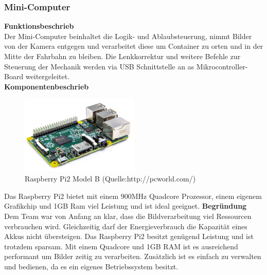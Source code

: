 \subsubsection{Mini-Computer}
\textbf{Funktionsbeschrieb}\\[0.2cm]
Der Mini-Computer beinhaltet die Logik- und Ablaubsteuerung, nimmt Bilder von der Kamera entgegen und verarbeitet diese um Container zu orten und in der Mitte der Fahrbahn zu bleiben. Die Lenkkorrektur und weitere Befehle zur Steuerung der Mechanik werden via USB Schnittstelle an as Mikrocontroller-Board weitergeleitet.\\[0.2cm]
\textbf{Komponentenbeschrieb}\\[0.2cm]
\begin{figure}[h]
	\centering
	\includegraphics[width=0.5\textwidth]{03_Loesungskonzept/pictures/raspberrypi2.png}
	\caption{Raspberry Pi2 Model B (Quelle:http://pcworld.com/)}
\end{figure}
Das Raspberry Pi2 bietet mit einem 900MHz Quadcore Prozessor, einem eigenem Grafikchip und 1GB Ram viel Leistung und ist ideal geeignet.
\textbf{Begründung}\\[0.2cm]
Dem Team war von Anfang an klar, dass die Bildverarbeitung viel Ressourcen verbrauchen wird. Gleichzeitig darf der Energieverbrauch die Kapazität eines Akkus nicht übersteigen. Das Raspberry Pi2 besitzt genügend Leistung und ist trotzdem sparsam. Mit einem Quadcore und 1GB RAM ist es ausreichend performant um Bilder zeitig zu verarbeiten. Zusätzlich ist es einfach zu verwalten und bedienen, da es ein eigenes Betriebssystem besitzt.\\[0.2cm]

